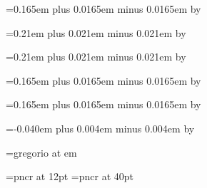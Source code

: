 \newskip\spaceafterlineclef
\spaceafterlineclef=0.165em plus 0.0165em minus 0.0165em
\multiply\spaceafterlineclef by \factor

\newskip\interwordspacenotes
\interwordspacenotes=0.21em plus 0.021em minus 0.021em
\multiply\interwordspacenotes by \factor

\newskip\interwordspacetext
\interwordspacetext=0.21em plus 0.021em minus 0.021em
\multiply\interwordspacetext by \factor

\newskip\bispace
\bispace=0.165em plus 0.0165em minus 0.0165em
\multiply\bispace by \factor

\newskip\trispace
\trispace=0.165em plus 0.0165em minus 0.0165em
\multiply\trispace by \factor

\newskip\punctuminclinatumshift
\punctuminclinatumshift=-0.040em plus 0.004em minus 0.004em
\multiply\punctuminclinatumshift by \factor



\newskip\barspace

\newskip\clefchangespace


\font\gregorianfont=gregorio at \the\factor em

\font\textfont=pncr at 12pt
\font\fontofinitial=pncr at 40pt

